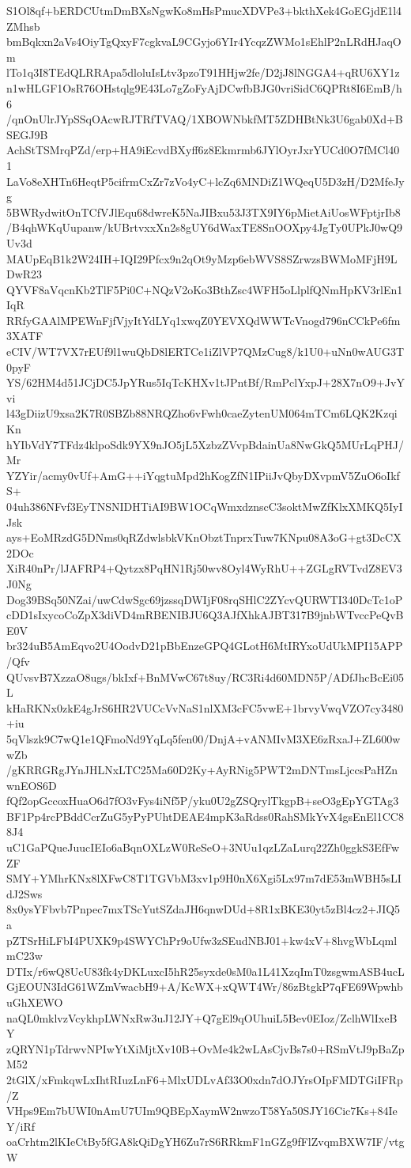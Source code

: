 S1Ol8qf+bERDCUtmDmBXsNgwKo8mHsPmucXDVPe3+bkthXek4GoEGjdE1l4ZMhsb
bmBqkxn2aVs4OiyTgQxyF7cgkvaL9CGyjo6YIr4YcqzZWMo1sEhlP2nLRdHJaqOm
lTo1q3I8TEdQLRRApa5dloluIsLtv3pzoT91HHjw2fe/D2jJ8lNGGA4+qRU6XY1z
n1wHLGF1OsR76OHstqlg9E43Lo7gZoFyAjDCwfbBJG0vriSidC6QPRt8I6EmB/h6
/qnOnUlrJYpSSqOAcwRJTRfTVAQ/1XBOWNbkfMT5ZDHBtNk3U6gab0Xd+BSEGJ9B
AchStTSMrqPZd/erp+HA9iEcvdBXyff6z8Ekmrmb6JYlOyrJxrYUCd0O7fMCl401
LaVo8eXHTn6HeqtP5cifrmCxZr7zVo4yC+lcZq6MNDiZ1WQeqU5D3zH/D2MfeJyg
5BWRydwitOnTCfVJlEqu68dwreK5NaJIBxu53J3TX9IY6pMietAiUosWFptjrIb8
/B4qhWKqUupanw/kUBrtvxxXn2s8gUY6dWaxTE8SnOOXpy4JgTy0UPkJ0wQ9Uv3d
MAUpEqB1k2W24IH+IQI29Pfcx9n2qOt9yMzp6ebWVS8SZrwzsBWMoMFjH9LDwR23
QYVF8aVqcnKb2TlF5Pi0C+NQzV2oKo3BthZsc4WFH5oLlplfQNmHpKV3rlEn1IqR
RRfyGAAlMPEWnFjfVjyItYdLYq1xwqZ0YEVXQdWWTcVnogd796nCCkPe6fm3XATF
eCIV/WT7VX7rEUf9l1wuQbD8lERTCe1iZlVP7QMzCug8/k1U0+uNn0wAUG3T0pyF
YS/62HM4d51JCjDC5JpYRus5IqTcKHXv1tJPntBf/RmPclYxpJ+28X7nO9+JvYvi
l43gDiizU9xsa2K7R0SBZb88NRQZho6vFwh0caeZytenUM064mTCm6LQK2KzqiKn
hYIbVdY7TFdz4klpoSdk9YX9nJO5jL5XzbzZVvpBdainUa8NwGkQ5MUrLqPHJ/Mr
YZYir/acmy0vUf+AmG++iYqgtuMpd2hKogZfN1IPiiJvQbyDXvpmV5ZuO6oIkfS+
04uh386NFvf3EyTNSNIDHTiAI9BW1OCqWmxdznscC3soktMwZfKlxXMKQ5IyIJsk
ays+EoMRzdG5DNms0qRZdwlsbkVKnObztTnprxTuw7KNpu08A3oG+gt3DcCX2DOc
XiR40nPr/lJAFRP4+Qytzx8PqHN1Rj50wv8Oyl4WyRhU++ZGLgRVTvdZ8EV3J0Ng
Dog39BSq50NZai/uwCdwSgc69jzssqDWIjF08rqSHlC2ZYcvQURWTI340DcTc1oP
cDD1sIxycoCoZpX3diVD4mRBENIBJU6Q3AJfXhkAJBT317B9jnbWTvccPeQvBE0V
br324uB5AmEqvo2U4OodvD21pBbEnzeGPQ4GLotH6MtIRYxoUdUkMPI15APP/Qfv
QUvsvB7XzzaO8ugs/bkIxf+BnMVwC67t8uy/RC3Ri4d60MDN5P/ADfJhcBcEi05L
kHaRKNx0zkE4gJrS6HR2VUCcVvNaS1nlXM3cFC5vwE+1brvyVwqVZO7cy3480+iu
5qVlszk9C7wQ1e1QFmoNd9YqLq5fen00/DnjA+vANMIvM3XE6zRxaJ+ZL600wwZb
/gKRRGRgJYnJHLNxLTC25Ma60D2Ky+AyRNig5PWT2mDNTmsLjccsPaHZnwnEOS6D
fQf2opGccoxHuaO6d7fO3vFys4iNf5P/yku0U2gZSQrylTkgpB+seO3gEpYGTAg3
BF1Pp4rcPBddCcrZuG5yPyPUhtDEAE4mpK3aRdss0RahSMkYvX4gsEnEl1CC88J4
uC1GaPQueJuucIEIo6aBqnOXLzW0ReSeO+3NUu1qzLZaLurq22Zh0ggkS3EfFwZF
SMY+YMhrKNx8lXFwC8T1TGVbM3xv1p9H0nX6Xgi5Lx97m7dE53mWBH5sLIdJ2Sws
8x0ysYFbvb7Pnpec7mxTScYutSZdaJH6qnwDUd+8R1xBKE30yt5zBl4cz2+JIQ5a
pZTSrHiLFbI4PUXK9p4SWYChPr9oUfw3zSEudNBJ01+kw4xV+8hvgWbLqmlmC23w
DTIx/r6wQ8UcU83fk4yDKLuxcI5hR25syxde0sM0a1L41XzqImT0zsgwmASB4ucL
GjEOUN3IdG61WZmVwacbH9+A/KcWX+xQWT4Wr/86zBtgkP7qFE69WpwhbuGhXEWO
naQL0mklvzVcykhpLWNxRw3uJ12JY+Q7gEl9qOUhuiL5Bev0EIoz/ZclhWlIxeBY
zQRYN1pTdrwvNPIwYtXiMjtXv10B+OvMe4k2wLAsCjvBs7s0+RSmVtJ9pBaZpM52
2tGlX/xFmkqwLxIhtRIuzLnF6+MlxUDLvAf33O0xdn7dOJYrsOIpFMDTGiIFRp/Z
VHps9Em7bUWI0nAmU7UIm9QBEpXaymW2nwzoT58Ya50SJY16Cic7Ks+84IeY/iRf
oaCrhtm2lKIeCtBy5fGA8kQiDgYH6Zu7rS6RRkmF1nGZg9fFlZvqmBXW7IF/vtgW
